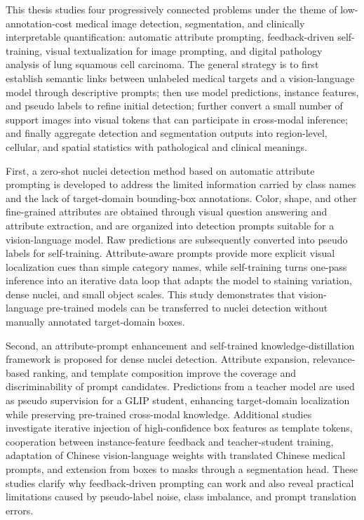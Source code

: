 This thesis studies four progressively connected problems under the theme of low-annotation-cost medical image detection, segmentation, and clinically interpretable quantification: automatic attribute prompting, feedback-driven self-training, visual textualization for image prompting, and digital pathology analysis of lung squamous cell carcinoma. The general strategy is to first establish semantic links between unlabeled medical targets and a vision-language model through descriptive prompts; then use model predictions, instance features, and pseudo labels to refine initial detection; further convert a small number of support images into visual tokens that can participate in cross-modal inference; and finally aggregate detection and segmentation outputs into region-level, cellular, and spatial statistics with pathological and clinical meanings.

First, a zero-shot nuclei detection method based on automatic attribute prompting is developed to address the limited information carried by class names and the lack of target-domain bounding-box annotations. Color, shape, and other fine-grained attributes are obtained through visual question answering and attribute extraction, and are organized into detection prompts suitable for a vision-language model. Raw predictions are subsequently converted into pseudo labels for self-training. Attribute-aware prompts provide more explicit visual localization cues than simple category names, while self-training turns one-pass inference into an iterative data loop that adapts the model to staining variation, dense nuclei, and small object scales. This study demonstrates that vision-language pre-trained models can be transferred to nuclei detection without manually annotated target-domain boxes.

Second, an attribute-prompt enhancement and self-trained knowledge-distillation framework is proposed for dense nuclei detection. Attribute expansion, relevance-based ranking, and template composition improve the coverage and discriminability of prompt candidates. Predictions from a teacher model are used as pseudo supervision for a GLIP student, enhancing target-domain localization while preserving pre-trained cross-modal knowledge. Additional studies investigate iterative injection of high-confidence box features as template tokens, cooperation between instance-feature feedback and teacher-student training, adaptation of Chinese vision-language weights with translated Chinese medical prompts, and extension from boxes to masks through a segmentation head. These studies clarify why feedback-driven prompting can work and also reveal practical limitations caused by pseudo-label noise, class imbalance, and prompt translation errors.

